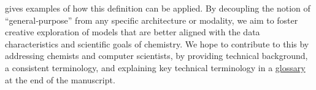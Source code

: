  gives examples of how this definition can be applied. 
By decoupling the notion of \enquote{general‑purpose} from any specific architecture or modality, we aim to foster creative exploration of models that are better aligned with the data characteristics and scientific goals of chemistry.
We hope to contribute to this by addressing chemists and computer scientists, by providing technical background, a consistent terminology, and explaining key technical terminology in a \hyperref[glossary]{glossary} at the end of the manuscript.

